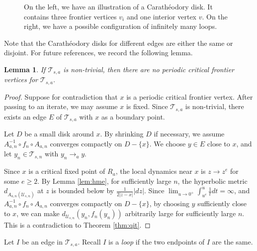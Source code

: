 \documentclass[11pt, reqno]{amsart}
\newcommand{\incfig}[1]{%
    \def\svgwidth{\columnwidth}
    {#1.pdf_tex}
}
\numberwithin{equation}{section}
\theoremstyle{plain}
\theoremstyle{theorem}
\newtheorem{lem}[theorem]{Lemma}
\theoremstyle{definition}
\newcommand{\T}{\mathcal{T}}
\newcommand{\U}{\mathcal{U}}
\numberwithin{figure}{section}
\begin{document}
\begin{figure}[ht]
  \centering
  \resizebox{1\linewidth}{!}{
  \incfig{FV}
  \incfig{Sp}
  }
  \caption{On the left, we have an illustration of a Carath\'eodory disk. It contains three frontier vertices $v_i$ and one interior vertex $v$. On the right, we have a possible configuration of infinitely many loops.}
  \label{fig:FV}
\end{figure}

Note that the Carath\'eodory disks for different edges are either the same or disjoint.
For future references, we record the following lemma.
\begin{lem}\label{lem:ncfh}
If $\T_{s,a}$ is non-trivial, then there are no periodic critical frontier vertices for $\T_{s,a}$.
\end{lem}
\begin{proof}
Suppose for contradiction that $x$ is a periodic critical frontier vertex.
After passing to an iterate, we may assume $x$ is fixed.
Since $\T_{s,a}$ is non-trivial, there exists an edge $E$ of $\T_{s,a}$ with $x$ as a boundary point.

Let $D$ be a small disk around $x$.
By shrinking $D$ if necessary, we assume $A_{a,n}^{-1} \circ f_n \circ A_{a,n}$ converges compactly on $D-\{x\}$.
We choose $y \in E$ close to $x$, and let $y_n \in \T_{s,n}$ with $y_n \to_a y$.

Since $x$ is a critical fixed point of $R_a$, the local dynamics near $x$ is $z\to z^e$ for some $e\geq 2$.
By Lemma \ref{lem:hme}, for sufficiently large $n$, the hyperbolic metric $d_{A_{a,n}(\U_{s,n})}$ at $z$ is bounded below by $\frac{1}{2|z-x|} |dz|$.
Since $\lim_{u\to 0^+} \int_{u^e}^{u} \frac{1}{t}dt = \infty$, and $A_{a,n}^{-1} \circ f_n \circ A_{a,n}$ converges compactly on $D-\{x\}$, by choosing $y$ sufficiently close to $x$, we can make $d_{\U_{s,n}}(y_n, f_n(y_n))$ arbitrarily large for sufficiently large $n$. This is a contradiction to Theorem \ref{thm:qit}.
\end{proof}

Let $I$ be an edge in $\T_{s,a}$.
Recall $I$ is a {\em loop} if the two endpoints of $I$ are the same.
\end{document}
